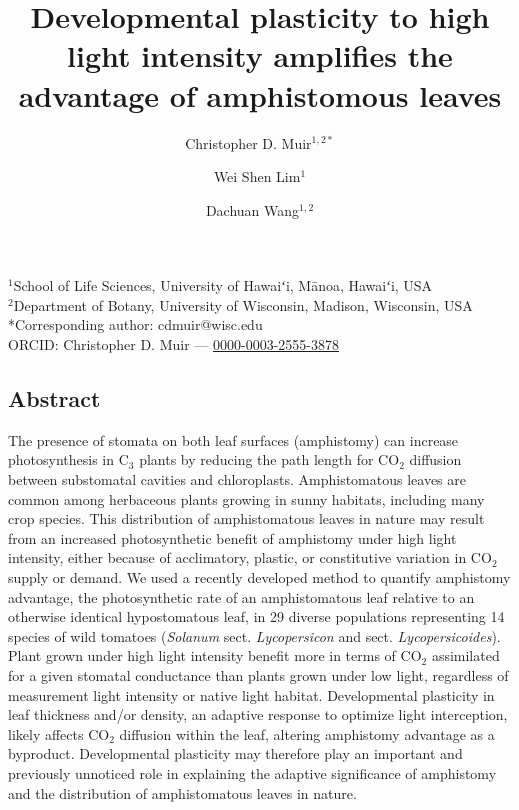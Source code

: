\documentclass[
  letterpaper,
  DIV=11,
  numbers=noendperiod]{scrartcl}
\title{Developmental plasticity to high light intensity amplifies the
advantage of amphistomous leaves}
\author{Christopher D. Muir\(^{1,2*}\) \and Wei Shen
Lim\(^{1}\) \and Dachuan Wang\(^{1,2}\)}
\date{}
\begin{document}
\maketitle

\begin{center}
$^1$School of Life Sciences, University of Hawaiʻi, Mānoa, Hawaiʻi, USA\\
$^2$Department of Botany, University of Wisconsin, Madison, Wisconsin, USA\\
\medskip
*Corresponding author: cdmuir@wisc.edu\\
\medskip
ORCID: Christopher D. Muir — \href{https://orcid.org/0000-0003-2555-3878}{0000-0003-2555-3878}\\
\end{center}

\subsection{Abstract}\label{abstract}

The presence of stomata on both leaf surfaces (amphistomy) can increase
photosynthesis in C\(_3\) plants by reducing the path length for
CO\(_2\) diffusion between substomatal cavities and chloroplasts.
Amphistomatous leaves are common among herbaceous plants growing in
sunny habitats, including many crop species. This distribution of
amphistomatous leaves in nature may result from an increased
photosynthetic benefit of amphistomy under high light intensity, either
because of acclimatory, plastic, or constitutive variation in CO\(_2\)
supply or demand. We used a recently developed method to quantify
amphistomy advantage, the photosynthetic rate of an amphistomatous leaf
relative to an otherwise identical hypostomatous leaf, in 29 diverse
populations representing 14 species of wild tomatoes (\emph{Solanum}
sect. \emph{Lycopersicon} and sect. \emph{Lycopersicoides}). Plant grown
under high light intensity benefit more in terms of CO\(_2\) assimilated
for a given stomatal conductance than plants grown under low light,
regardless of measurement light intensity or native light habitat.
Developmental plasticity in leaf thickness and/or density, an adaptive
response to optimize light interception, likely affects CO\(_2\)
diffusion within the leaf, altering amphistomy advantage as a byproduct.
Developmental plasticity may therefore play an important and previously
unnoticed role in explaining the adaptive significance of amphistomy and
the distribution of amphistomatous leaves in nature.
\end{document}
